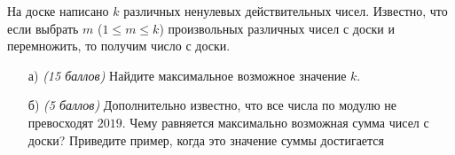 
На доске написано $k$ различных ненулевых действительных чисел.
	Известно, что если выбрать $m$ 
	($1 \leq m \leq k$) произвольных
	различных чисел с доски и перемножить, то
	получим число с доски.
    
    \begin{enumerate}
        \item[а)] \textit{(15 баллов)} Найдите максимальное возможное значение 
	$k$.
        \item[б)] \textit{(5 баллов)} Дополнительно известно, что все числа 
	по модулю не превосходят $2019$. Чему 
	равняется максимально возможная сумма
	чисел с доски? Приведите пример, когда это
    значение суммы достигается
    \end{enumerate}